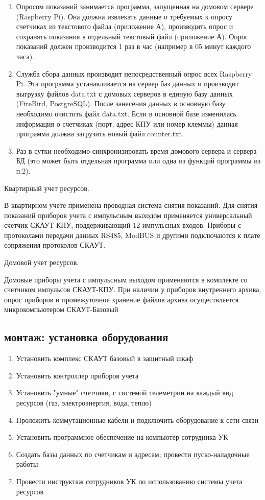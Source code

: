 \begin{enumerate}
	\item Опросом показаний занимается программа, запущенная на домовом сервере (Raspberry Pi).  Она должна извлекать данные о требуемых к опросу счетчиках из текстового файла (приложение А), производить опрос и сохранять показания в отдельный текстовый файл (приложение А). Опрос показаний должен производится 1 раз  в час (например в 05 минут каждого часа).
	\item Служба сбора данных производит непосредственный опрос всех Raspberry Pi. Эта программа устанавливается на сервер баз данных и производит выгрузку файлов data.txt  с домовых серверов в единую базу данных (FireBird, PostgreSQL). После занесения данных в основную базу необходимо очистить файл data.txt.  Если в основной базе изменилась информация о счетчиках (порт, адрес КПУ или номер клеммы) данная программа должна загрузить новый файл counter.txt.
	\item Раз в сутки необходимо синхронизировать время домового сервера и сервера БД (это может быть отдельная программа или одна из функций программы из п.2).	
\end{enumerate}

Квартирный учет ресурсов.

В квартирном учете применена проводная система снятия показаний. Для снятия показаний приборов учета с импульсным выходом применяется универсальный счетчик СКАУТ-КПУ, поддерживающий 12 импульсных входов. Приборы с протоколами передачи данных RS485, ModBUS и другими подключаются к плате сопряжения протоколов СКАУТ.

Домовой учет ресурсов.

Домовые приборы учета с импульсным выходом применяются в комплекте со счетчиком импульсов СКАУТ-КПУ. При наличии у приборов внутреннего архива, опрос приборов и промежуточное хранение файлов архива осуществляется микрокомпьютером СКАУТ-Базовый

\subsection{монтаж: установка оборудования}

\begin{enumerate}
	\item Установить комплекс СКАУТ базовый в защитный шкаф
	\item Установить контроллер приборов учета
	\item Установить "умные" счетчики, с системой телеметрии на каждый вид ресурсов (газ, электроэнергия, вода, тепло)
	\item Проложить коммутационные кабели и подключить оборудование к сети связи
	\item Установить программное обеспечение на компьютер сотрудника УК
	\item Создать базы данных по счетчикам и адресам; провести пуско-наладочные работы
	\item Провести инструктаж сотрудников УК по использованию системы учета ресурсов
\end{enumerate}


